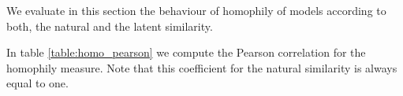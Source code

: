 \documentclass[a4paper, 12pt]{article}
\begin{document}
%
%


We evaluate in this section the behaviour of homophily of models according to both, the natural and the latent similarity.

In table \ref{table:homo_pearson} we compute the Pearson correlation for the homophily measure. Note that this coefficient for the natural similarity is always equal to one.
\end{document}
